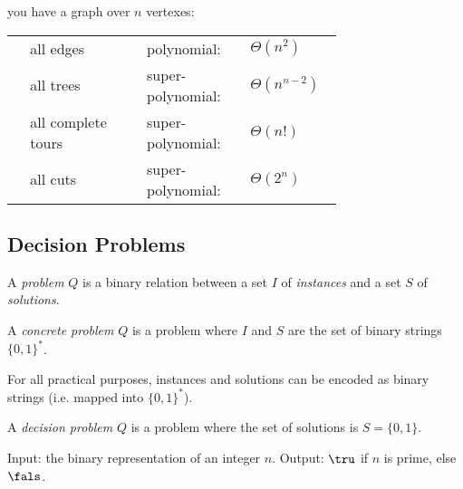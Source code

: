 you have a graph over $n$ vertexes:\\[2pt]
\begin{tabular}{p{0.025\linewidth} p{0.3\linewidth} p{0.25\linewidth} p{0.15\linewidth}}
& all edges                        & polynomial:        & $\Theta(n^2)$\\ 
& all trees                        & super-polynomial:  & $\Theta(n^{n-2})$\\ 
& all complete tours               & super-polynomial:  & $\Theta(n!)$\\ 
& all cuts                         & super-polynomial:  & $\Theta(2^n)$ \\ 
\end{tabular}




\subsection{Decision Problems}\label{sec:decision_problems}
\begin{definition}[Problem]
A \emph{problem} $Q$ is a binary relation between a set $I$ of \emph{instances} and a set $S$ of \emph{solutions}.
\end{definition}

\begin{definition}
A \emph{concrete problem} $Q$ is a problem where $I$ and $S$ are the set of binary strings $\{0,1\}^{\ast}$.
\end{definition}
For all practical purposes, instances and solutions can be encoded as binary strings (i.e. mapped into $\{0,1\}^{\ast}$).

\begin{definition}
A \emph{decision problem} $Q$ is a problem where the set of solutions is $S=\{0,1\}$.
\end{definition}
\begin{example}
Input: the binary representation of an integer $n$.
Output: $\tru$ if $n$ is prime, else $\fals$.
\end{example}



